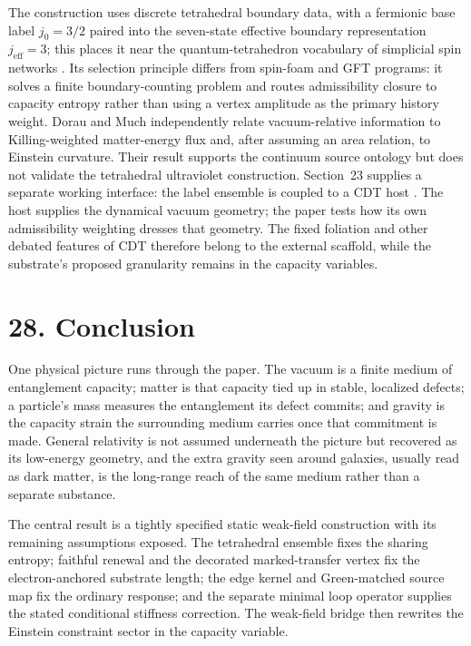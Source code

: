 \documentclass[11pt]{article}
\begin{document}
The construction uses discrete tetrahedral boundary data, with a fermionic base label $j_0=3/2$ paired into the seven-state effective boundary representation $j_{\mathrm{eff}}=3$; this places it near the quantum-tetrahedron vocabulary of simplicial spin networks \citep{Barbieri1998,BaezBarrett1999,RovelliSmolin1995}. Its selection principle differs from spin-foam and GFT programs: it solves a finite boundary-counting problem and routes admissibility closure to capacity entropy rather than using a vertex amplitude as the primary history weight. Dorau and Much \citep{DorauMuch2026} independently relate vacuum-relative information to Killing-weighted matter-energy flux and, after assuming an area relation, to Einstein curvature. Their result supports the continuum source ontology but does not validate the tetrahedral ultraviolet construction. Section~23 supplies a separate working interface: the label ensemble is coupled to a CDT host \citep{AmbjornJurkiewiczLoll2004,AmbjornGJL2012}. The host supplies the dynamical vacuum geometry; the paper tests how its own admissibility weighting dresses that geometry. The fixed foliation and other debated features of CDT therefore belong to the external scaffold, while the substrate's proposed granularity remains in the capacity variables.

\section{28. Conclusion}

One physical picture runs through the paper. The vacuum is a finite medium of entanglement capacity; matter is that capacity tied up in stable, localized defects; a particle's mass measures the entanglement its defect commits; and gravity is the capacity strain the surrounding medium carries once that commitment is made. General relativity is not assumed underneath the picture but recovered as its low-energy geometry, and the extra gravity seen around galaxies, usually read as dark matter, is the long-range reach of the same medium rather than a separate substance.

The central result is a tightly specified static weak-field construction with its remaining assumptions exposed. The tetrahedral ensemble fixes the sharing entropy; faithful renewal and the decorated marked-transfer vertex fix the electron-anchored substrate length; the edge kernel and Green-matched source map fix the ordinary response; and the separate minimal loop operator supplies the stated conditional stiffness correction. The weak-field bridge then rewrites the Einstein constraint sector in the capacity variable.
\end{document}
